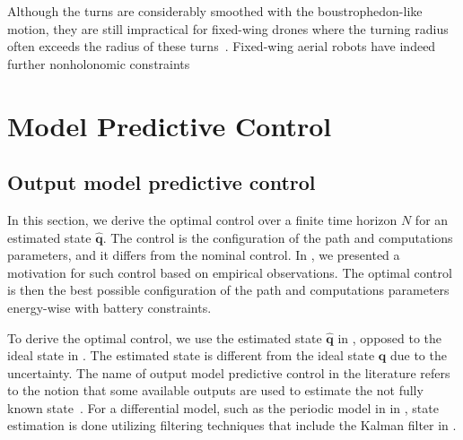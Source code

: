 
Although the turns are considerably smoothed with the boustrophedon-like motion, they are still impractical for fixed-wing drones where the turning radius often exceeds the radius of these turns~\citep{xu2011optimal,xu2014efficient}. Fixed-wing aerial robots have indeed further nonholonomic constraints


\section{\color{cyan}Model Predictive Control}



\subsection{Output model predictive control}
\label{sec:output-mpc}

In this section, we derive the optimal control over a finite time horizon $N$ for an estimated state $\hat{\mathbf{q}}$. The control is the configuration of the path and computations parameters, and it differs from the nominal control. In , we presented a motivation for such control based on empirical observations. The optimal control is then the best possible configuration of the path and computations parameters energy-wise with battery constraints.

To derive the optimal control, we use the estimated state $\hat{\mathbf{q}}$ in , opposed to the ideal state in . The estimated state is different from the ideal state $\mathbf{q}$ due to the uncertainty. The name of output model predictive control in the literature refers to the notion that some available outputs are used to estimate the not fully known state~\citep{rawlings2017model}. For a differential model, such as the periodic model in  in , state estimation is done utilizing filtering techniques that include the Kalman filter in .

